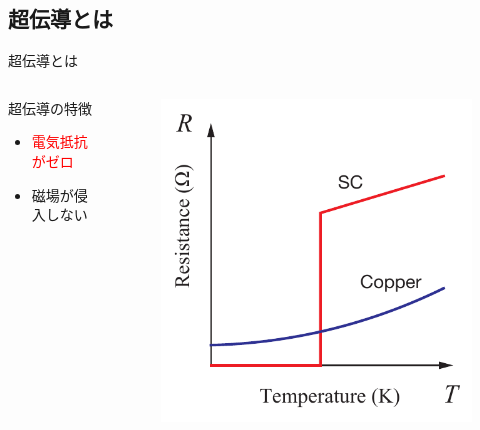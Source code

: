 \documentclass[aspectratio=169, unicode, 10pt]{beamer}
\begin{document}
	\subsection{超伝導とは}
	\begin{frame}{超伝導とは}
		\begin{columns}
			\begin{column}{0.5\linewidth}
				\begin{block}{超伝導の特徴}
					\begin{itemize}
						\item \textcolor{red}{電気抵抗がゼロ}
						\item 磁場が侵入しない
					\end{itemize}
				\end{block}
			\end{column}
			\begin{column}{0.5\linewidth}
				\begin{figure}
					\centering
					\includegraphics[width=0.95\linewidth]{figs/SC_temp.pdf}
				\end{figure}
			\end{column}
		\end{columns}
	\end{frame}
\end{document}
